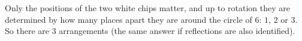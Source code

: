 Only the positions of the two white chips matter, and up to rotation they are determined by how many places apart they are around the circle of $6$: $1$, $2$ or $3$. So there are $\boxed{3}$ arrangements (the same answer if reflections are also identified).
